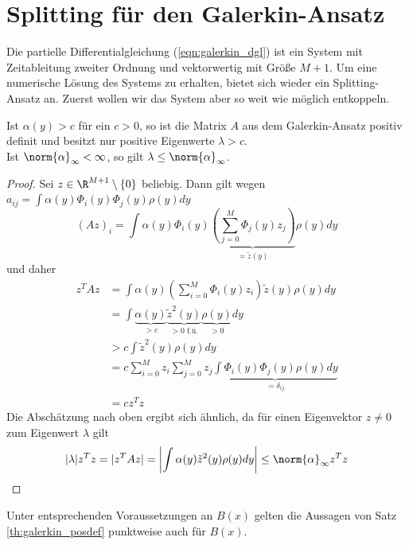 \section{Splitting für den Galerkin-Ansatz}
Die partielle Differentialgleichung (\ref{eqn:galerkin_dgl}) ist ein System mit Zeitableitung zweiter Ordnung und vektorwertig mit Größe $M+1$. Um eine numerische Lösung des Systems zu erhalten, bietet sich wieder ein Splitting-Ansatz an. Zuerst wollen wir das System aber so weit wie möglich entkoppeln.
\begin{maththeorem}
\label{th:galerkin_posdef}
Ist $\alpha(y)>c$ für ein $c>0$, so ist die Matrix $A$ aus dem Galerkin-Ansatz positiv definit und besitzt nur positive Eigenwerte $\lambda>c$.\\
Ist $\norm{\alpha}_\infty < \infty$, so gilt $\lambda\le \norm{\alpha}_\infty$.
\end{maththeorem}
\begin{proof}
Sei $z\in\R^{M+1}\setminus \lbrace 0\rbrace$ beliebig. Dann gilt wegen $a_{ij}=\int \alpha(y)\Phi_i(y)\Phi_j(y)\rho(y)dy$
\[(Az)_i=\int \alpha(y)\Phi_i(y)\underbrace{\left(\sum_{j=0}^M\Phi_j(y)z_j\right)}_{=\tilde{z}(y)}\rho(y)dy\]
und daher
\begin{align*}
z^TAz&=\int \alpha(y)\left(\sum_{i=0}^M\Phi_i(y)z_i\right)\tilde{z}(y)\rho(y)dy\\
&=\int\underbrace{\alpha(y)}_{>c}\underbrace{\tilde{z}^2(y)}_{>0 \text{ f.ü.}}\underbrace{\rho(y)}_{>0}dy\\
&>c\int \tilde{z}^2(y)\rho(y)dy\\
&=c\sum_{i=0}^Mz_i\sum_{j=0}^Mz_j\underbrace{\int \Phi_i(y)\Phi_j(y)\rho(y)dy}_{=\delta_{ij}}\\
&=cz^Tz
\end{align*}
Die Abschätzung nach oben ergibt sich ähnlich, da für einen Eigenvektor $z\neq 0$ zum Eigenwert $\lambda$ gilt
\[|\lambda| z^Tz=|z^TAz|=\left|\int \alpha(y)\tilde{z}^2(y)\rho(y)dy\right|\leq \norm{\alpha}_\infty z^Tz\]
\end{proof}
Unter entsprechenden Voraussetzungen an $B(x)$ gelten die Aussagen von Satz \ref{th:galerkin_posdef} punktweise auch für $B(x)$.
